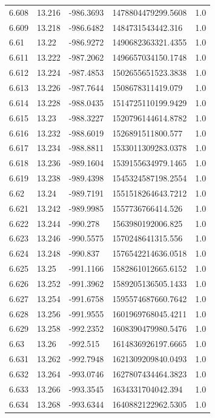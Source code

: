 \begin{tabular}{lllll}
6.608 & 13.216 & -986.3693 & 1478804479299.5608 & 1.0 \\
6.609 & 13.218 & -986.6482 & 1484731543442.316 & 1.0 \\
6.61 & 13.22 & -986.9272 & 1490682363321.4355 & 1.0 \\
6.611 & 13.222 & -987.2062 & 1496657034150.1748 & 1.0 \\
6.612 & 13.224 & -987.4853 & 1502655651523.3838 & 1.0 \\
6.613 & 13.226 & -987.7644 & 1508678311419.079 & 1.0 \\
6.614 & 13.228 & -988.0435 & 1514725110199.9429 & 1.0 \\
6.615 & 13.23 & -988.3227 & 1520796144614.8782 & 1.0 \\
6.616 & 13.232 & -988.6019 & 1526891511800.577 & 1.0 \\
6.617 & 13.234 & -988.8811 & 1533011309283.0378 & 1.0 \\
6.618 & 13.236 & -989.1604 & 1539155634979.1465 & 1.0 \\
6.619 & 13.238 & -989.4398 & 1545324587198.2554 & 1.0 \\
6.62 & 13.24 & -989.7191 & 1551518264643.7212 & 1.0 \\
6.621 & 13.242 & -989.9985 & 1557736766414.526 & 1.0 \\
6.622 & 13.244 & -990.278 & 1563980192006.825 & 1.0 \\
6.623 & 13.246 & -990.5575 & 1570248641315.556 & 1.0 \\
6.624 & 13.248 & -990.837 & 1576542214636.0518 & 1.0 \\
6.625 & 13.25 & -991.1166 & 1582861012665.6152 & 1.0 \\
6.626 & 13.252 & -991.3962 & 1589205136505.1433 & 1.0 \\
6.627 & 13.254 & -991.6758 & 1595574687660.7642 & 1.0 \\
6.628 & 13.256 & -991.9555 & 1601969768045.4211 & 1.0 \\
6.629 & 13.258 & -992.2352 & 1608390479980.5476 & 1.0 \\
6.63 & 13.26 & -992.515 & 1614836926197.6665 & 1.0 \\
6.631 & 13.262 & -992.7948 & 1621309209840.0493 & 1.0 \\
6.632 & 13.264 & -993.0746 & 1627807434464.3823 & 1.0 \\
6.633 & 13.266 & -993.3545 & 1634331704042.394 & 1.0 \\
6.634 & 13.268 & -993.6344 & 1640882122962.5305 & 1.0 \\

\end{tabular}
